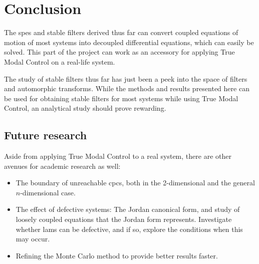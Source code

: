 \chapter{Conclusion}
The \glspl{spe} and stable filters derived thus far 
can convert coupled equations of motion of most systems into 
decoupled differential equations, which can easily be solved. 
This part of the project can work as an accessory for applying
True Modal Control on a real-life system.

The study of stable filters thus far has just been a peek into the
space of filters and automorphic transforms. While the methods and 
results presented here can be used for obtaining stable filters 
for most systems while using True Modal Control, an analytical 
study should prove rewarding.

\section{Future research}
Aside from applying True Modal Control to a real system, there
are other avenues for academic research as well:
\begin{itemize}
\item The boundary of unreachable \glspl{cpc}, both in the 2-dimensional and 
the general $n$-dimensional case.
\item The effect of defective systems: The Jordan canonical form, and
study of loosely coupled equations that the Jordan form represents. 
Investigate whether \glspl{lam} can be defective, and if so, explore the 
conditions when this may occur.
\item Refining the Monte Carlo method to provide better results faster.
\end{itemize}